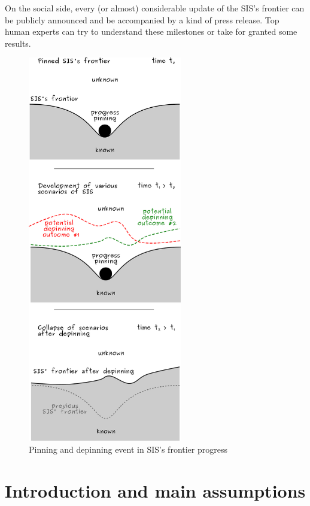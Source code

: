 \documentclass[a4paper,11pt]{article}
\begin{document}
On the social side, every (or almost) considerable update of the SIS's frontier can be publicly announced and be accompanied by a kind of press release. Top human experts can try to understand these milestones or take for granted some results.

\begin{figure}[ht!]
    \centering\includegraphics[width=0.6\textwidth]{depinning_2.pdf}
    \caption{\label{fig:pinning}Pinning and depinning event in SIS's frontier progress}
\end{figure}


\newpage

	\section{Introduction and main assumptions}
\end{document}
